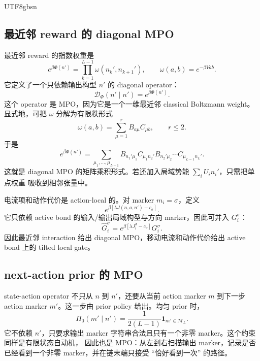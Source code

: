 \documentclass[11pt]{article}
\begin{document}
\begin{CJK*}{UTF8}{gbsn}
\subsection{最近邻 reward 的 diagonal MPO}

最近邻 reward 的指数权重是
\begin{equation}
    e^{\beta\Phi(n')}
    =
    \prod_{k=1}^{L-1}
    \omega(n_k',n_{k+1}'),
    \qquad
    \omega(a,b)=e^{-\beta Vab}.
\end{equation}
它定义了一个只依赖输出构型 \(n'\) 的 diagonal operator：
\begin{equation}
    \mathcal D_\Phi(n'\mid n')
    =
    e^{\beta\Phi(n')}.
\end{equation}
这个 operator 是 MPO，因为它是一个一维最近邻 classical Boltzmann weight。显式地，可把
\(\omega\) 分解为有限秩形式
\begin{equation}
    \omega(a,b)=\sum_{\mu=1}^{r}B_{a\mu}C_{\mu b},
    \qquad
    r\le 2.
\end{equation}
于是
\begin{equation}
    e^{\beta\Phi(n')}
    =
    \sum_{\mu_1,\dots,\mu_{L-1}}
    B_{n_1'\mu_1}
    C_{\mu_1 n_2'}B_{n_2'\mu_2}
    \cdots
    C_{\mu_{L-1} n_L'}.
    \label{eq:reward-mpo-factorization}
\end{equation}
这就是 diagonal MPO 的矩阵乘积形式。若还加入局域势能 \(\sum_i U_i n_i'\)，只需把单点权重
吸收到相邻张量中。

电流项和动作代价是 action-local 的。对 marker \(m_i=\sigma\)，定义
\begin{equation}
    e^{\beta[\lambda J(n,a,n')-c_\sigma]}.
\end{equation}
它只依赖 active bond 的输入/输出局域构型与方向 marker，因此可并入 \(G_i^\sigma\)：
\begin{equation}
    \widehat G_i^\sigma
    =
    e^{\beta[\lambda J_i^\sigma-c_\sigma]}
    G_i^\sigma.
    \label{eq:tilted-local-gate}
\end{equation}
因此最近邻 interaction 给出 diagonal MPO，移动电流和动作代价给出 active bond 上的 tilted local
gate。

\subsection{next-action prior 的 MPO}

state-action operator 不只从 \(n\) 到 \(n'\)，还要从当前 action marker \(m\) 到下一步 action marker
\(m'\)。这一步由 prior policy 给出。均匀 prior 时，
\begin{equation}
    \Pi_0(m'\mid n')
    =
    \frac{1}{2(L-1)}
    \mathbf 1_{m'\in\mathcal M_L}.
    \label{eq:marker-prior}
\end{equation}
它不依赖 \(n'\)，只要求输出 marker 字符串合法且只有一个非零 marker。这个约束同样是有限状态自动机，
因此也是 MPO：从左到右扫描输出 marker，记录是否已经看到一个非零 marker，并在链末端只接受
``恰好看到一次'' 的路径。


\end{CJK*}
\end{document}
